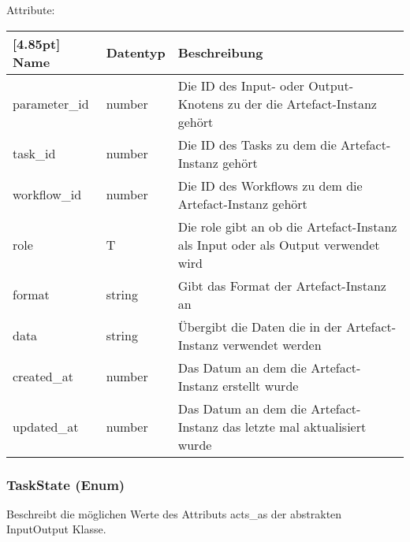     		Attribute:
            \begin{center}
            	\renewcommand{\arraystretch}{1.5}
                \setlength\tabcolsep{5pt}
            	\begin{tabularx}{\textwidth}{|l|l|X|}
            		\hline
                    \rowcolor[gray]{0.75}[4.85pt]            		
                    Name & Datentyp & Beschreibung \\ \hline
            	    parameter_id & number & Die ID des Input- oder Output-Knotens zu der die Artefact-Instanz gehört \\ \hline
            	    task_id & number & Die ID des Tasks zu dem die Artefact-Instanz gehört \\ \hline
            	    workflow_id & number & Die ID des Workflows zu dem die Artefact-Instanz gehört \\ \hline
            	    role & T & Die role gibt an ob die Artefact-Instanz als Input oder als Output verwendet wird \\ \hline
                    format & string & Gibt das Format der Artefact-Instanz an \\ \hline
                    data & string & Übergibt die Daten die in der Artefact-Instanz verwendet werden \\ \hline
                    created_at & number & Das Datum an dem die Artefact-Instanz erstellt wurde \\ \hline
            	    updated_at & number & Das Datum an dem die Artefact-Instanz das letzte mal aktualisiert wurde\\ \hline
            	\end{tabularx}
            \end{center}
            
    		\subsubsection{TaskState (Enum)}
			Beschreibt die möglichen Werte des Attributs acts\_as der abstrakten InputOutput Klasse. \newline
			
